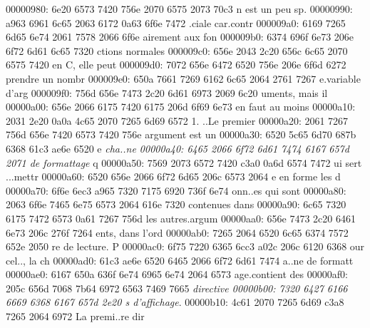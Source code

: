 \begin{soluti
00000210: 6f6e 7d0a 2020 5c62 6567 696e 7b6c 7374  on}
\begin{lst
00000220: 6c69 7374 696e 677d 5b6c 616e 6775 6167  listing}[languag
00000230: 653d 6261 7368 5d0a 2020 2020 6769 7420  e=bash]
\begin{lst
00000330: 6c69 7374 696e 677d 5b6c 616e 6775 6167  listing}[languag
00000340: 653d 435d 0a23 696e 636c 7564 6520 3c73  e=C]
\begin{cente
000003e0: 727d 0a20 205c 736c 204f 6e20 7661 206d  r}
\begin{solu
00000490: 7469 6f6e 7d0a 2020 5c62 6567 696e 7b6c  tion}
\begin{l
000004a0: 7374 6c69 7374 696e 677d 5b6c 616e 6775  stlisting}[langu
000004b0: 6167 653d 6261 7368 5d0a 2020 2020 6364  age=bash]
\begin{so
00000540: 6c75 7469 6f6e 7d0a 2020 5c62 6567 696e  lution}
\begin{solutioncachee}
\begin{lstlis
00000630: 7469 6e67 7d5b 6c61 6e67 7561 6765 3d62  ting}[language=b
00000640: 6173 685d 0a20 2020 202e 2f65 7865 7263  ash]
\begin{center}
\begin{ce
00000880: 6e74 6572 7d0a 2020 5c66 626f 787b 7e5c  nter}
00000980: 6e20 6573 7420 756e 2070 6575 2073 70c3  n est un peu sp.
00000990: a963 6961 6c65 2063 6172 0a63 6f6e 7472  .ciale car.contr
000009a0: 6169 7265 6d65 6e74 2061 7578 2066 6f6e  airement aux fon
000009b0: 6374 696f 6e73 206e 6f72 6d61 6c65 7320  ctions normales 
000009c0: 656e 2043 2c20 656c 6c65 2070 6575 7420  en C, elle peut 
000009d0: 7072 656e 6472 6520 756e 206e 6f6d 6272  prendre un nombr
000009e0: 650a 7661 7269 6162 6c65 2064 2761 7267  e.variable d'arg
000009f0: 756d 656e 7473 2c20 6d61 6973 2069 6c20  uments, mais il 
00000a00: 656e 2066 6175 7420 6175 206d 6f69 6e73  en faut au moins
00000a10: 2031 2e20 0a0a 4c65 2070 7265 6d69 6572   1. ..Le premier
00000a20: 2061 7267 756d 656e 7420 6573 7420 756e   argument est un
00000a30: 6520 5c65 6d70 687b 6368 61c3 ae6e 6520  e \emph{cha..ne 
00000a40: 6465 2066 6f72 6d61 7474 6167 657d 2071  de formattage} q
00000a50: 7569 2073 6572 7420 c3a0 0a6d 6574 7472  ui sert ...mettr
00000a60: 6520 656e 2066 6f72 6d65 206c 6573 2064  e en forme les d
00000a70: 6f6e 6ec3 a965 7320 7175 6920 736f 6e74  onn..es qui sont
00000a80: 2063 6f6e 7465 6e75 6573 2064 616e 7320   contenues dans 
00000a90: 6c65 7320 6175 7472 6573 0a61 7267 756d  les autres.argum
00000aa0: 656e 7473 2c20 6461 6e73 206c 276f 7264  ents, dans l'ord
00000ab0: 7265 2064 6520 6c65 6374 7572 652e 2050  re de lecture. P
00000ac0: 6f75 7220 6365 6cc3 a02c 206c 6120 6368  our cel.., la ch
00000ad0: 61c3 ae6e 6520 6465 2066 6f72 6d61 7474  a..ne de formatt
00000ae0: 6167 650a 636f 6e74 6965 6e74 2064 6573  age.contient des
00000af0: 205c 656d 7068 7b64 6972 6563 7469 7665   \emph{directive
00000b00: 7320 6427 6166 6669 6368 6167 657d 2e20  s d'affichage}. 
00000b10: 4c61 2070 7265 6d69 c3a8 7265 2064 6972  La premi..re dir

\end{ce
00000880: 6e74 6572 7d0a 2020 5c66 626f 787b 7e5c  nter}
\end{center}
\end{lstlis
00000630: 7469 6e67 7d5b 6c61 6e67 7561 6765 3d62  ting}
\end{solutioncachee}
\end{so
00000540: 6c75 7469 6f6e 7d0a 2020 5c62 6567 696e  lution}
\end{l
000004a0: 7374 6c69 7374 696e 677d 5b6c 616e 6775  stlisting}
\end{solu
00000490: 7469 6f6e 7d0a 2020 5c62 6567 696e 7b6c  tion}
\end{cente
000003e0: 727d 0a20 205c 736c 204f 6e20 7661 206d  r}
\end{lst
00000330: 6c69 7374 696e 677d 5b6c 616e 6775 6167  listing}
\end{lst
00000220: 6c69 7374 696e 677d 5b6c 616e 6775 6167  listing}
\end{soluti
00000210: 6f6e 7d0a 2020 5c62 6567 696e 7b6c 7374  on}
